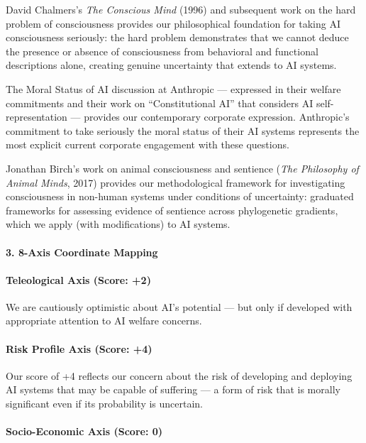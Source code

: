 David Chalmers's \emph{The Conscious Mind} (1996) and subsequent work on
the hard problem of consciousness provides our philosophical foundation
for taking AI consciousness seriously: the hard problem demonstrates
that we cannot deduce the presence or absence of consciousness from
behavioral and functional descriptions alone, creating genuine
uncertainty that extends to AI systems.

The Moral Status of AI discussion at Anthropic --- expressed in their
welfare commitments and their work on ``Constitutional AI'' that
considers AI self-representation --- provides our contemporary corporate
expression. Anthropic's commitment to take seriously the moral status of
their AI systems represents the most explicit current corporate
engagement with these questions.

Jonathan Birch's work on animal consciousness and sentience (\emph{The
Philosophy of Animal Minds}, 2017) provides our methodological framework
for investigating consciousness in non-human systems under conditions of
uncertainty: graduated frameworks for assessing evidence of sentience
across phylogenetic gradients, which we apply (with modifications) to AI
systems.

\paragraph{3. 8-Axis Coordinate
Mapping}\label{axis-coordinate-mapping-37}

\paragraph{Teleological Axis (Score:
+2)}\label{teleological-axis-score-2-5}

We are cautiously optimistic about AI's potential --- but only if
developed with appropriate attention to AI welfare concerns.

\paragraph{Risk Profile Axis (Score:
+4)}\label{risk-profile-axis-score-4-2}

Our score of +4 reflects our concern about the risk of developing and
deploying AI systems that may be capable of suffering --- a form of risk
that is morally significant even if its probability is uncertain.

\paragraph{Socio-Economic Axis (Score:
0)}\label{socio-economic-axis-score-0-1}


